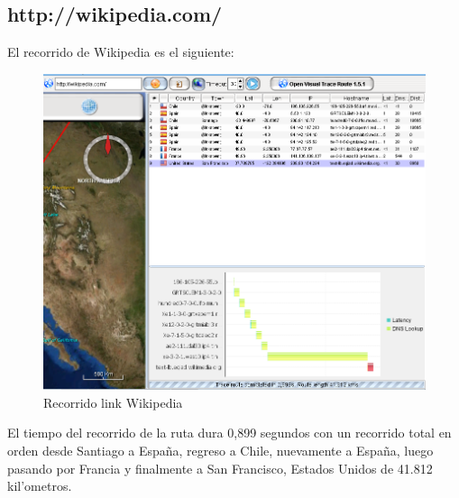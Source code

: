 \documentclass{article}
\begin{document}
\subsection{http://wikipedia.com/}
El recorrido de Wikipedia es el siguiente:
\\
\begin{figure}[H]
  \centering
    \includegraphics[width=1.0\textwidth]{ruta1_wikipedia}
  \caption{Recorrido link Wikipedia}
  \label{wikipedia}
\end{figure}

El tiempo del recorrido de la ruta dura 0,899 segundos con un recorrido total en orden desde Santiago a Espa\~na, regreso a Chile, nuevamente a Espa\~na, luego pasando por Francia y finalmente a San Francisco, Estados Unidos de 41.812 kil'ometros.
\newpage
\end{document}
